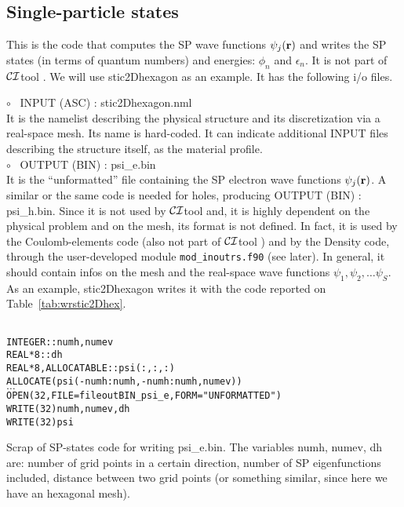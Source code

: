 \documentclass[12pt,twoside]{article}
\newcommand*{\CItool}[0]{{$\cal CI$}\textsf{tool} }
\begin{document}


\subsection*{Single-particle states}

This is the code that computes the SP wave functions $\psi_j({\bf r})$
and writes the SP states (in terms of quantum numbers) and energies:
$\phi_n$ and $\epsilon_n$.  It is not part of \CItool. We will use
\textsf{stic2Dhexagon} as an example. It has the following i/o files.

$\circ$ \ \textsf{INPUT (ASC) : stic2Dhexagon.nml} \\
It is the namelist describing the physical structure and its
discretization via a real-space mesh.  Its name is hard-coded.  It can
indicate additional \textsf{INPUT} files describing the structure
itself, as the material profile.
\\
$\circ$ \ \textsf{OUTPUT (BIN) : psi\_e.bin} \\ It is the
``unformatted'' file containing the SP electron wave functions
$\psi_j({\bf r})$.  A similar or the same code is needed for holes,
producing \textsf{OUTPUT (BIN) : psi\_h.bin}.  Since it is not used by
\CItool and, it is highly dependent on the physical problem
and on the mesh, its format is not defined.  In fact, it is used by
the Coulomb-elements code (also not part of \CItool) and by
the Density code, through the user-developed module
\verb#mod_inoutrs.f90# (see later).  In general, it should contain
infos on the mesh and the real-space wave functions 
$\psi_1, \psi_2, \dots \psi_S$. 
\\
As an example, \textsf{stic2Dhexagon} writes it with the code reported on
Table~\ref{tab:wrstic2Dhex}.

\begin{table}
\begin{alltt}
\ \\
INTEGER :: numh, numev
REAL*8 :: dh
REAL*8, ALLOCATABLE :: psi(:,:,:)
ALLOCATE(psi(-numh:numh, -numh:numh, numev))
\( \dots \)
OPEN(32, FILE=fileoutBIN_psi_e, FORM="UNFORMATTED")
WRITE(32) numh, numev, dh
WRITE(32) psi
\end{alltt}
\caption{Scrap of SP-states code for writing \textsf{psi\_e.bin}.
The variables \textsf{numh, numev, dh} are: number of grid points in a certain direction,
number of SP eigenfunctions included, distance between two grid points (or something
similar, since here we have an hexagonal mesh).
} 
\label{tab:wrstic2Dhex}
\end{table}
\end{document}
